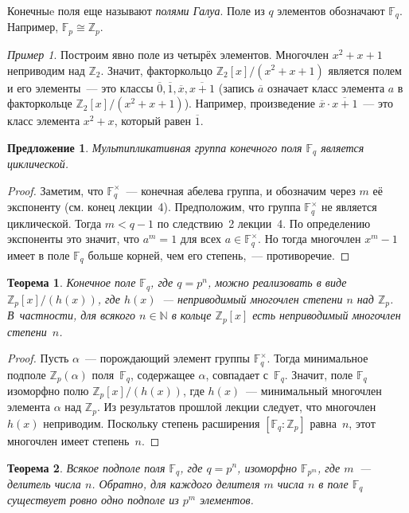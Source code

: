 \documentclass[a4paper,10pt]{amsart}
\def\FF{{\mathbb F}}%
\def\ZZ{{\mathbb Z}}%
\def\NN{{\mathbb N}}%
\newtheorem{theorem}{Теорема}
\newtheorem{proposition}{Предложение}
\theoremstyle{definition}
\theoremstyle{remark}
\newtheorem{example}{Пример}
\begin{document}
Конечныe поля еще называют {\it полями Галуа}. Поле из $q$ элементов
обозначают $\FF_q$. Например, $\FF_p \cong \ZZ_p$.

\begin{example}
	Построим явно поле из четырёх элементов. Многочлен $x^2+x+1$
	неприводим над $\ZZ_2$. Значит, факторкольцо $\ZZ_2[x]/(x^2+x+1)$
	является полем и его элементы~--- это классы $\overline{0},
	\overline{1}, \overline{x}, \overline{x+1}$ (запись $\overline a$
	означает класс элемента $a$ в факторкольце $\ZZ_2[x]/(x^2+x+1)$).
	Например, произведение $\overline{x} \cdot \overline{x+1}$~--- это
	класс элемента $x^2+x$, который равен $\overline{1}$.
\end{example}

\begin{proposition}
	Мультипликативная группа конечного поля $\FF_q$ является
	циклической.
\end{proposition}

\begin{proof}
	Заметим, что $\FF_q^\times$~--- конечная абелева группа, и обозначим
	через $m$ её экспоненту (см. конец лекции~4). Предположим, что
	группа $\FF_q^{\times}$ не является циклической. Тогда $m < q-1$ по
	следствию~2 лекции~4. По определению экспоненты это значит, что $a^m
	= 1$ для всех $a \in \FF_q^{\times}$. Но тогда многочлен $x^m-1$
	имеет в поле $\FF_q$ больше корней, чем его степень,~---
	противоречие.
\end{proof}

\begin{theorem}
	Конечное поле $\FF_q$, где $q=p^n$, можно реализовать в виде
	$\ZZ_p[x]/(h(x))$, где $h(x)$~--- неприводимый многочлен степени $n$
	над $\ZZ_p$. В~частности, для всякого $n \in \NN$ в кольце
	$\ZZ_p[x]$ есть неприводимый многочлен степени~$n$.
\end{theorem}

\begin{proof}
	Пусть $\alpha$~--- порождающий элемент группы $\FF_q^{\times}$.
	Тогда минимальное подполе $\ZZ_p(\alpha)$ поля~$\FF_q$, содержащее
	$\alpha$, совпадает с~$\FF_q$. Значит, поле $\FF_q$ изоморфно полю
	$\ZZ_p[x]/(h(x))$, где $h(x)$~--- минимальный многочлен элемента
	$\alpha$ над $\ZZ_p$. Из результатов прошлой лекции следует, что
	многочлен $h(x)$ неприводим. Поскольку степень расширения $[\FF_q :
	\ZZ_p]$ равна~$n$, этот многочлен имеет степень~$n$.
\end{proof}

\begin{theorem}
	Всякое подполе поля $\FF_q$, где $q=p^n$, изоморфно $\FF_{p^m}$, где
	$m$~--- делитель числа $n$. Обратно, для каждого делителя $m$ числа
	$n$ в поле $\FF_q$ существует ровно одно подполе из $p^m$ элементов.
\end{theorem}
\end{document}
